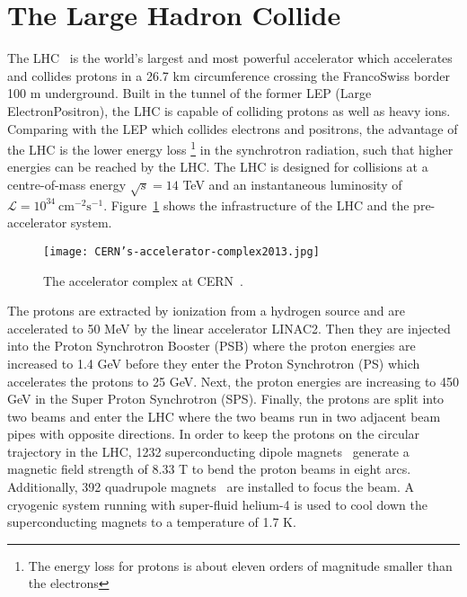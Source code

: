\section{The Large Hadron Collide}
The LHC~\cite{1748-0221-3-08-S08001} is the world's largest and most powerful accelerator which accelerates and collides protons in a 26.7 km circumference crossing the Franco\textendash Swiss border 100 m underground.
Built in the tunnel of the former LEP (Large Electron\textendash Positron), the LHC is capable of colliding protons as well as heavy ions.
Comparing with the LEP which collides electrons and positrons, the advantage of the LHC is the lower energy loss \footnote{The energy loss for protons is about eleven orders of magnitude smaller than the electrons} in the synchrotron radiation, such that higher energies can be reached by the LHC.
The LHC is designed for collisions at a centre-of-mass energy $\sqrt{s}=14$ TeV and an instantaneous luminosity of $\mathcal{L} =10^{34} \ \textrm{cm}^{-2}\textrm{s}^{-1}$.
Figure~\ref{fig:CERN_accelerator_complex} shows the infrastructure of the LHC and the pre-accelerator system.

\begin{figure}[htbp]
\begin{center}
\texttt{[image: CERN's-accelerator-complex2013.jpg]}
\caption{The accelerator complex at CERN~\cite{Marcastel:1621583}.}
\label{fig:CERN_accelerator_complex}
\end{center}
\end{figure}

The protons are extracted by ionization from a hydrogen source and are accelerated to 50 MeV by the linear accelerator LINAC2.
Then they are injected into the Proton Synchrotron Booster (PSB) where the proton energies are increased to 1.4 GeV before they enter the Proton Synchrotron (PS) which accelerates the protons to 25 GeV.
Next, the proton energies are increasing to 450 GeV in the Super Proton Synchrotron (SPS). 
Finally, the protons are split into two beams and enter the LHC where the two beams run in two adjacent beam pipes with opposite directions.
In order to keep the protons on the circular trajectory in the LHC, 1232 superconducting dipole magnets~\cite{1288863} generate a magnetic field strength of 8.33 T to bend the proton beams in eight arcs.
Additionally, 392 quadrupole magnets~\cite{1288863} are installed to focus the beam.
A cryogenic system running with super-fluid helium-4 is used to cool down the superconducting magnets to a temperature of 1.7 K.

